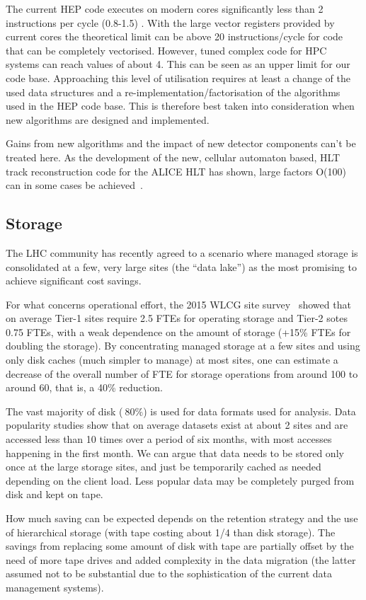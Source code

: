 The current HEP code executes on modern cores significantly less than
2 instructions per cycle (0.8-1.5) . With the large vector registers
provided by current cores the theoretical limit can be above 20
instructions/cycle for code that can be completely
vectorised. However, tuned complex code for HPC systems can reach
values of about 4. This can be seen as an upper limit for our code
base. Approaching this level of utilisation requires at least a change
of the used data structures and a re-implementation/factorisation of
the algorithms used in the HEP code base. This is therefore best taken
into consideration when new algorithms are designed and implemented.

Gains from new algorithms and the impact of new detector components
can’t be treated here. As the development of the new, cellular
automaton based, HLT track reconstruction code for the ALICE HLT has
shown, large factors O(100) can in some cases be achieved~\cite{rohr}.

\subsection{Storage}
The LHC community has recently agreed to a scenario where managed
storage is consolidated at a few, very large sites (the ``data lake'')
as the most promising to achieve significant cost savings.

For what concerns operational effort, the 2015 WLCG site
survey~\cite{survey} showed that on average Tier-1 sites require 2.5
FTEs for operating storage and Tier-2 sotes 0.75 FTEs, with a weak
dependence on the amount of storage (+15\% FTEs for doubling the
storage). By concentrating managed storage at a few sites and using
only disk caches (much simpler to manage) at most sites, one can
estimate a decrease of the overall number of FTE for storage
operations from around 100 to around 60, that is, a 40\% reduction.

The vast majority of disk ($~80\%$) is used for data formats used for
analysis. Data popularity studies show that on average datasets exist
at about 2 sites and are accessed less than 10 times over a period of
six months, with most accesses happening in the first month.  We can
argue that data needs to be stored only once at the large storage
sites, and just be temporarily cached as needed depending on the
client load. Less popular data may be completely purged from disk and
kept on tape.

How much saving can be expected depends on the retention strategy and
the use of hierarchical storage (with tape costing about 1/4 than disk
storage). The savings from replacing some amount of disk with tape are
partially offset by the need of more tape drives and added complexity
in the data migration (the latter assumed not to be substantial due to
the sophistication of the current data management systems).

